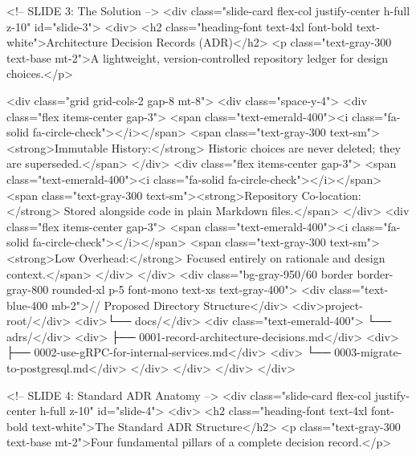             <!-- SLIDE 3: The Solution -->
            <div class="slide-card flex-col justify-center h-full z-10" id="slide-3">
                <div>
                    <h2 class="heading-font text-4xl font-bold text-white">Architecture Decision Records (ADR)</h2>
                    <p class="text-gray-300 text-base mt-2">A lightweight, version-controlled repository ledger for design choices.</p>
                    
                    <div class="grid grid-cols-2 gap-8 mt-8">
                        <div class="space-y-4">
                            <div class="flex items-center gap-3">
                                <span class="text-emerald-400"><i class="fa-solid fa-circle-check"></i></span>
                                <span class="text-gray-300 text-sm"><strong>Immutable History:</strong> Historic choices are never deleted; they are superseded.</span>
                            </div>
                            <div class="flex items-center gap-3">
                                <span class="text-emerald-400"><i class="fa-solid fa-circle-check"></i></span>
                                <span class="text-gray-300 text-sm"><strong>Repository Co-location:</strong> Stored alongside code in plain Markdown files.</span>
                            </div>
                            <div class="flex items-center gap-3">
                                <span class="text-emerald-400"><i class="fa-solid fa-circle-check"></i></span>
                                <span class="text-gray-300 text-sm"><strong>Low Overhead:</strong> Focused entirely on rationale and design context.</span>
                            </div>
                        </div>
                        <div class="bg-gray-950/60 border border-gray-800 rounded-xl p-5 font-mono text-xs text-gray-400">
                            <div class="text-blue-400 mb-2">// Proposed Directory Structure</div>
                            <div>project-root/</div>
                            <div>└── docs/</div>
                            <div class="text-emerald-400">    └── adrs/</div>
                            <div>        ├── 0001-record-architecture-decisions.md</div>
                            <div>        ├── 0002-use-gRPC-for-internal-services.md</div>
                            <div>        └── 0003-migrate-to-postgresql.md</div>
                        </div>
                    </div>
                </div>
            </div>

            <!-- SLIDE 4: Standard ADR Anatomy -->
            <div class="slide-card flex-col justify-center h-full z-10" id="slide-4">
                <div>
                    <h2 class="heading-font text-4xl font-bold text-white">The Standard ADR Structure</h2>
                    <p class="text-gray-300 text-base mt-2">Four fundamental pillars of a complete decision record.</p>
                    
